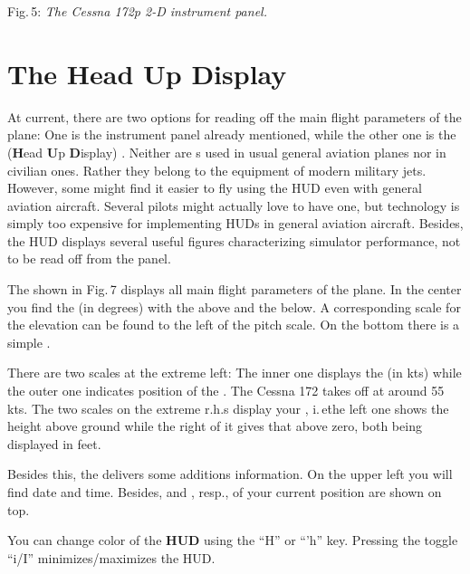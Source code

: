 \smallskip
 \noindent
Fig.\,5: \textit{The Cessna 172p 2-D instrument panel.}
\medskip

\section{The Head Up Display}

At current, there are two options for reading off the main flight parameters of
the
plane: One is the instrument panel already mentioned, while the other one is the
 (\textbf{H}ead \textbf{U}p \textbf{D}isplay) . Neither
are s used in usual general aviation planes nor in civilian ones.
Rather they
belong to the equipment of modern military jets. However, some might find it
easier to
fly using the HUD even with general aviation aircraft. Several 
pilots
might actually love to have one, but technology is simply too expensive for
implementing
HUDs in general aviation aircraft. Besides, the HUD displays several useful
figures
characterizing simulator performance, not to be read off from the panel.

The  shown in Fig.\,7  displays all main flight parameters of the
plane. In
the center you find the  (in degrees) with the
 above and the  below. A corresponding scale
for the
elevation can be found to the left of the pitch
scale. On the
bottom there is a simple .

There are two scales at the extreme left: The inner one displays the
 (in
kts) while the outer one indicates position of the . The Cessna
172 takes
off at around 55 kts. The two scales on the extreme r.h.s display your
,
i.\,e\. the left one shows the height above ground while the right of it gives
that above
zero, both being displayed in feet.

Besides this, the  delivers some additions information. On the upper
left you
will find date and time. Besides,   and ,
resp., of your current position are shown on top.

You can change color of the \textbf{HUD} using the ``H'' or ``'h''  key.
Pressing the toggle ``i/I'' minimizes/maximizes the HUD.

